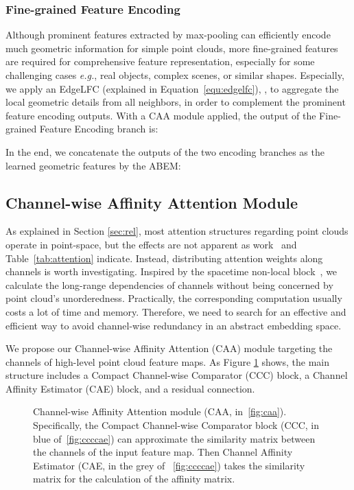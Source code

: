 \documentclass[journal,twoside]{IEEEtran}
\newcommand{\latinphrase}[1]{\textit{#1}}
\newcommand{\eg}{\latinphrase{e.g.}\xspace}
\begin{document}
\subsubsection{Fine-grained Feature Encoding}
Although prominent features extracted by max-pooling can efficiently encode much geometric information for simple point clouds, more fine-grained features are required for comprehensive feature representation, especially for some challenging cases \eg, real objects, complex scenes, or similar shapes. Especially, we apply an EdgeLFC (explained in Equation~\ref{equ:edgelfc}), , to aggregate the local geometric details from all neighbors, in order to complement the prominent feature encoding outputs. With a CAA module applied, the output of the Fine-grained Feature Encoding branch is:


In the end, we concatenate the outputs of the two encoding branches as the learned geometric features by the ABEM:


\subsection{Channel-wise Affinity Attention Module}
\label{ref:CAA}
As explained in Section \ref{sec:rel}, most attention structures regarding point clouds operate in point-space, but the effects are not apparent as work~\cite{xie2018attentional} and Table~\ref{tab:attention} indicate. Instead, distributing attention weights along channels is worth investigating. Inspired by the spacetime non-local block~\cite{wang2018non}, we calculate the long-range dependencies of channels without being concerned by point cloud's unorderedness.  Practically, the corresponding computation usually costs a lot of time and memory. Therefore, we need to search for an effective and efficient way to avoid channel-wise redundancy in an abstract embedding space.

We propose our Channel-wise Affinity Attention (CAA) module targeting the channels of high-level point cloud feature maps. As Figure \ref{fig:caa_all} shows, the main structure includes a Compact Channel-wise Comparator (CCC) block, a Channel Affinity Estimator (CAE) block, and a residual connection.
\begin{figure}
\begin{center}
\end{center}
  \caption{Channel-wise Affinity Attention module (CAA, in~\ref{fig:caa}). Specifically, the Compact Channel-wise Comparator block (CCC, in blue of~\ref{fig:ccccae}) can approximate the similarity matrix between the channels of the input feature map. Then Channel Affinity Estimator (CAE, in the grey of ~\ref{fig:ccccae}) takes the similarity matrix for the calculation of the affinity matrix.}
\label{fig:caa_all}
\end{figure}
\end{document}
